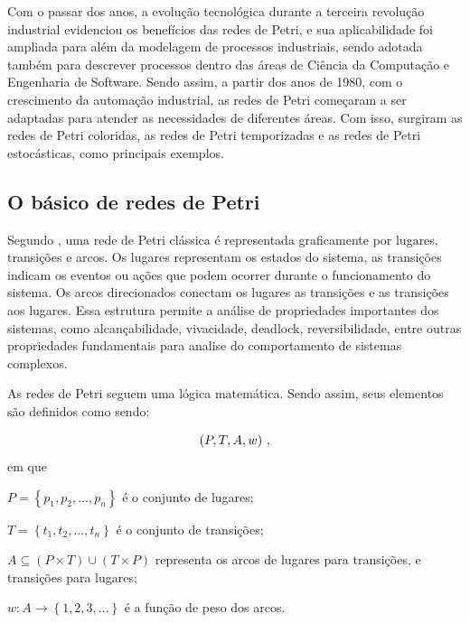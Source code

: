 \documentclass[
	12pt,				%
	openright,			%
	oneside,			%
	a4paper,			%
	english,			%
	brazil				%
	]{abntex2}
\begin{document}
Com o passar dos anos, a evolução tecnológica durante a terceira revolução industrial \cite{coutinho1992terceira} evidenciou os benefícios das redes de Petri, e sua aplicabilidade foi ampliada para além da modelagem de processos industriais, sendo adotada também para descrever processos dentro das áreas de Ciência da Computação e Engenharia de Software. Sendo assim, a partir dos anos de 1980, com o crescimento da automação industrial, as redes de Petri começaram a ser adaptadas para atender as necessidades de diferentes áreas. Com isso, surgiram as redes de Petri coloridas, as redes de Petri temporizadas e as redes de Petri estocásticas, como principais exemplos. 

\subsection*{O básico de redes de Petri}

Segundo \cite{CassandrasLafortune08}, uma rede de Petri clássica é representada graficamente por lugares, transições e arcos. Os lugares representam os estados do sistema, as transições indicam os eventos ou ações que podem ocorrer durante o funcionamento do sistema. Os arcos direcionados conectam os lugares as transições e as transições aos lugares. Essa estrutura permite a análise de propriedades importantes dos sistemas, como alcançabilidade, vivacidade, deadlock, reversibilidade, entre outras propriedades fundamentais para analise do comportamento de sistemas complexos. 

As redes de Petri seguem uma lógica matemática. Sendo assim, seus elementos são definidos como sendo:

\begin{equation*}
    \centering
    \left( P, T, A, w \right) \,,
    \label{elementos_rede_petri}
\end{equation*}
em que 

\textbf{$P = \left \{ p_{1},p_{2},...,p_{n} \right \}$} é o conjunto de lugares;

$T = \left \{ t_{1},t_{2},...,t_{n} \right \}$ é o conjunto de transições;

$A \subseteq \left ( P \times T \right ) \cup \left ( T \times P \right )$ representa os arcos de lugares para transições, e transições para lugares;

$w: A \rightarrow \left \{ 1,2,3,... \right \}$ é a função de peso dos arcos.

\end{document}
